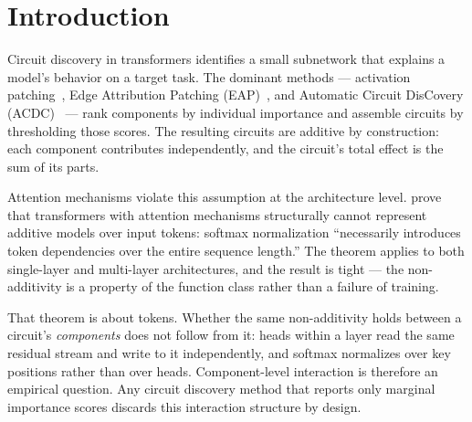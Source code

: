 \documentclass{article}
\begin{document}


%
%

\section{Introduction}
\label{sec:introduction}

Circuit discovery in transformers identifies a small subnetwork that
explains a model's behavior on a target task. The dominant methods ---
activation patching~\citep{wang2022ioi}, Edge Attribution Patching
(EAP)~\citep{syed2023attribution}, and Automatic Circuit DisCovery
(ACDC)~\citep{conmy2023acdc} --- rank components by individual
importance and assemble circuits by thresholding those scores. The
resulting circuits are additive by construction: each component
contributes independently, and the circuit's total effect is the sum of
its parts.

Attention mechanisms violate this assumption at the architecture level.
\citet{leemann2024slalom} prove that transformers with attention
mechanisms structurally cannot represent additive models over input
tokens: softmax normalization ``necessarily introduces token
dependencies over the entire sequence length.'' The theorem applies to
both single-layer and multi-layer architectures, and the result is
tight --- the non-additivity is a property of the function class rather
than a failure of training.

That theorem is about tokens. Whether the same non-additivity holds
between a circuit's \emph{components} does not follow from it: heads
within a layer read the same residual stream and write to it
independently, and softmax normalizes over key positions rather than
over heads. Component-level interaction is therefore an empirical
question. Any circuit discovery method that
reports only marginal importance scores discards this interaction
structure by design.
\end{document}
